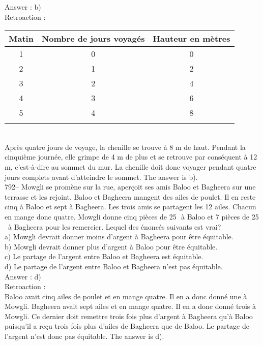 ﻿\documentclass[letterpaper, 12pt]{article}
\begin{document}
Answer : b)\\

Retroaction : \\

\begin{tabular}{|c|c|c|} \hline
{\bf Matin} & {\bf Nombre de jours voyag\'es} & {\bf Hauteur en m\`etres} \\
\hline \hline

1 & 0 & 0 \\ \hline
2 & 1 & 2\\ \hline
3 & 2 & 4\\ \hline
4 & 3 & 6\\ \hline
5 & 4 & 8\\ \hline
\multicolumn{3}{c}{}\\

\end{tabular}\\

Apr\`es quatre jours de voyage, la chenille se trouve \`a 8 m de haut.
Pendant la cinqui\`eme journ\'ee, elle grimpe de 4 m de plus et se retrouve
par cons\'equent \`a 12 m, c'est-\`a-dire au sommet du mur.  La chenille
doit donc voyager pendant quatre jours complets avant d'atteindre le sommet.
  The answer is b).\\

792-- Mowgli se prom\`ene sur la rue, aper\c coit ses amis Baloo et Bagheera
sur une terrasse et les rejoint.  Baloo et Bagheera mangent des ailes de
poulet.  Il en reste cinq \`a Baloo et sept \`a Bagheera.  Les trois amis se
partagent les 12 ailes.  Chacun en mange donc quatre.  Mowgli donne cinq
pi\`eces de 25\,\cent \ \`a Baloo et 7 pi\`eces de 25\,\cent \ \`a Bagheera
pour les remercier.  Lequel des \'enonc\'es suivants est vrai?\\
a) Mowgli devrait donner moins d'argent \`a Bagheera pour \^etre
\'equitable.\\
b) Mowgli devrait donner plus d'argent \`a Baloo pour \^etre \'equitable.\\
c) Le partage de l'argent entre Baloo et Bagheera est \'equitable.\\
d) Le partage de l'argent entre Baloo et Bagheera n'est pas \'equitable.\\

Answer : d)\\

Retroaction : \\
Baloo avait cinq ailes de poulet et en mange quatre.  Il en a donc donn\'e
une \`a Mowgli.  Bagheera avait sept ailes et en mange quatre.  Il en a donc
donn\'e trois \`a Mowgli.  Ce dernier doit remettre trois fois plus d'argent
\`a Bagheera qu'\`a Baloo puisqu'il a re\c cu trois fois plus d'ailes de
Bagheera que de Baloo.  Le partage de l'argent n'est donc pas \'equitable.
The answer is d).\\
\end{document}
